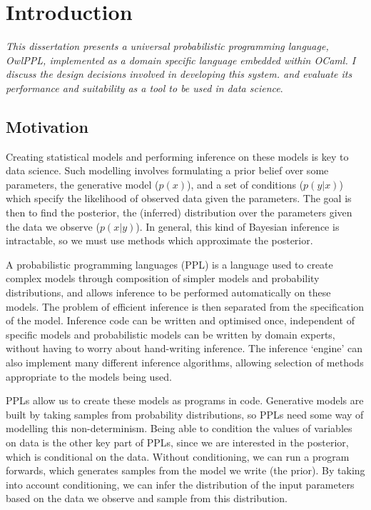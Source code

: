 \chapter{Introduction}

\textit{This dissertation presents a universal probabilistic programming language, OwlPPL, implemented as a domain specific language embedded within OCaml. I discuss the design decisions involved in developing this system. and evaluate its performance and suitability as a tool to be used in data science}.

\section{Motivation}
Creating statistical models and performing inference on these models is key to data science. Such modelling involves formulating a prior belief over some parameters, the generative model ($p(x)$), and a set of conditions ($p(y|x)$) which specify the likelihood of observed data given the parameters. The goal is then to find the posterior, the (inferred) distribution over the parameters given the data we observe ($p(x|y)$). In general, this kind of Bayesian inference is intractable, so we must use methods which approximate the posterior.

A probabilistic programming languages (PPL) is a language used to create complex models through composition of simpler models and probability distributions, and allows inference to be performed automatically on these models. The problem of efficient inference is then separated from the specification of the model. Inference code can be written and optimised once, independent of specific models and probabilistic models can be written by domain experts, without having to worry about hand-writing inference. The inference `engine' can also implement many different inference algorithms, allowing selection of methods appropriate to the models being used.

PPLs allow us to create these models as programs in code. Generative models are built by taking samples from probability distributions, so PPLs need some way of modelling this non-determinism. Being able to condition the values of variables on data is the other key part of PPLs, since we are interested in the posterior, which is conditional on the data. Without conditioning, we can run a program forwards, which generates samples from the model we write (the prior). By taking into account conditioning, we can infer the distribution of the input parameters based on the data we observe and sample from this distribution.

